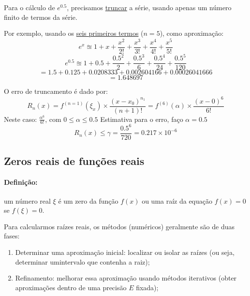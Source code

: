 \documentclass{article}
\begin{document}
            Para o cálculo de $e^{0.5}$, precisamos \underline{truncar} a série, usando apenas um número finito de termos da série.

            Por exemplo, usando os \underline{seis primeiros termos} ($n = 5$), como aproximação:
            \[e^x \approxeq 1 + x + \frac{x^2}{2!} + \frac{x^3}{3!} + \frac{x^4}{4!} + \frac{x^5}{5!}\]
            \[e^{0.5} \approxeq 1 + 0.5 + \frac{0.5^2}{2} + \frac{0.5^3}{6} + \frac{0.5^4}{24} + \frac{0.5^5}{120}\]
            \[= 1.5 + 0.125 + 0.0208333 + 0.002604166 + 0.00026041666\]
            \[= 1.648697\]

            O erro de truncamento é dado por:
            \[R_n(x) = f^{(n=1)}(\xi_x) \times \frac{(x - x_0)^{n_1}}{(n+1)!} = f^{(6)}(\alpha) \times \frac{(x - 0)^6}{6!}\]
            Neste caso: $\frac{\alpha^6}{6!}$, com $0 \leq \alpha \leq 0.5$
            Estimativa para o erro, faço $\alpha = 0.5$
            \[R_n(x) \leq \gamma = \frac{0.5^6}{720} = 0.217 \times 10^{-6}\]

    \subsection{Zeros reais de funções reais}
        \paragraph{Definição:} um número real $\xi$ é um zero da função $f(x)$ ou uma raíz da equação $f(x)=0$ se $f(\xi)=0$.


        Para calcularmos raízes reais, os métodos (numéricos) geralmente são de duas fases:

        \begin{enumerate}
            \item Determinar uma aproximação inicial: localizar ou isolar as raízes (ou seja, determinar umintervalo que contenha a raiz);
            \item Refinamento: melhorar essa aproximação usando métodos iterativos (obter aproximações dentro de uma precisão $E$ fixada);
        \end{enumerate}
\end{document}
